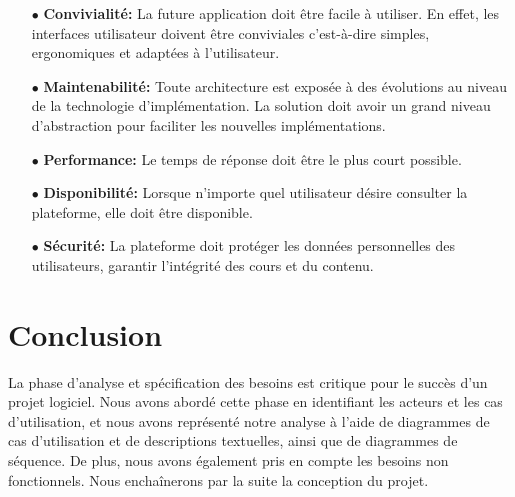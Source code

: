 \begin{itemize}
    \item[$\bullet$] \textbf{Convivialité:} La future application doit être facile à utiliser. En effet, les interfaces utilisateur doivent être conviviales c’est-à-dire simples, ergonomiques et adaptées à l’utilisateur.
    \item[$\bullet$] \textbf{Maintenabilité:} Toute architecture est exposée à des évolutions au niveau de la technologie d’implémentation. La solution doit avoir un grand niveau d’abstraction pour faciliter les nouvelles implémentations.
    \item[$\bullet$] \textbf{Performance:} Le temps de réponse doit être le plus court possible.
    \item[$\bullet$] \textbf{Disponibilité:} Lorsque n’importe quel utilisateur désire consulter la plateforme, elle doit être disponible.
    \item[$\bullet$] \textbf{Sécurité:} La plateforme doit protéger les données personnelles des utilisateurs, garantir l'intégrité des cours et du contenu.
\end{itemize}
\newpage
\section*{Conclusion}
La phase d’analyse et spécification des besoins est critique pour le succès d’un projet logiciel. Nous avons abordé cette phase en identifiant les acteurs et les cas d'utilisation, et nous avons représenté notre analyse à l'aide de diagrammes de cas d'utilisation et de descriptions textuelles, ainsi que de diagrammes de séquence. De plus, nous avons également pris en compte les besoins non fonctionnels. Nous enchaînerons par la suite la conception du projet.
